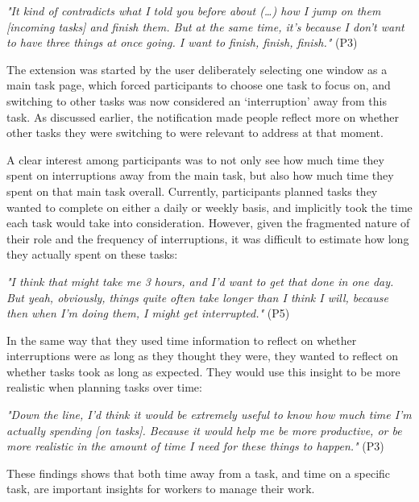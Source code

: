 \textit{"It kind of contradicts what I told you before about (…) how I jump on them [incoming tasks] and finish them. But at the same time, it’s because I don’t want to have three things at once going. I want to finish, finish, finish."} (P3)

The extension was started by the user deliberately selecting one window as a main task page, which forced participants to choose one task to focus on, and switching to other tasks was now considered an ‘interruption’ away from this task. As discussed earlier, the notification made people reflect more on whether other tasks they were switching to were relevant to address at that moment. 

A clear interest among participants was to not only see how much time they spent on interruptions away from the main task, but also how much time they spent on that main task overall. Currently, participants planned tasks they wanted to complete on either a daily or weekly basis, and implicitly took the time each task would take into consideration. However, given the fragmented nature of their role and the frequency of interruptions, it was difficult to estimate how long they actually spent on these tasks:

\textit{"I think that might take me 3 hours, and I’d want to get that done in one day. But yeah, obviously, things quite often take longer than I think I will, because then when I’m doing them, I might get interrupted."} (P5)

 In the same way that they used time information to reflect on whether interruptions were as long as they thought they were, they wanted to reflect on whether tasks took as long as expected. They would use this insight to be more realistic when planning tasks over time: 

\textit{"Down the line, I’d think it would be extremely useful to know how much time I’m actually spending [on tasks]. Because it would help me be more productive, or be more realistic in the amount of time I need for these things to happen."} (P3) 

These findings shows that both time away from a task, and time on a specific task, are important insights for workers to manage their work.

